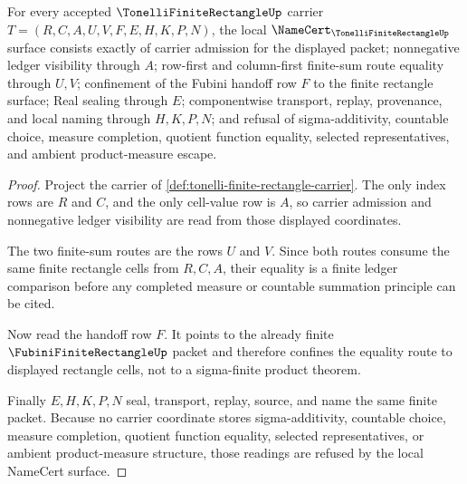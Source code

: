 \begin{theorem}
\label{thm:tonelli-finite-rectangle-namecert-obligations}
For every accepted $\TonelliFiniteRectangleUp$ carrier $T=(R,C,A,U,V,F,E,H,K,P,N)$, the local $\NameCert_{\TonelliFiniteRectangleUp}$ surface consists exactly of carrier admission for the displayed packet; nonnegative ledger visibility through $A$; row-first and column-first finite-sum route equality through $U,V$; confinement of the Fubini handoff row $F$ to the finite rectangle surface; Real sealing through $E$; componentwise transport, replay, provenance, and local naming through $H,K,P,N$; and refusal of sigma-additivity, countable choice, measure completion, quotient function equality, selected representatives, and ambient product-measure escape.
\end{theorem}
\begin{proof}
Project the carrier of \autoref{def:tonelli-finite-rectangle-carrier}. The only index rows are $R$ and $C$, and the only cell-value row is $A$, so carrier admission and nonnegative ledger visibility are read from those displayed coordinates.

The two finite-sum routes are the rows $U$ and $V$. Since both routes consume the same finite rectangle cells from $R,C,A$, their equality is a finite ledger comparison before any completed measure or countable summation principle can be cited.

Now read the handoff row $F$. It points to the already finite $\FubiniFiniteRectangleUp$ packet and therefore confines the equality route to displayed rectangle cells, not to a sigma-finite product theorem.

Finally $E,H,K,P,N$ seal, transport, replay, source, and name the same finite packet. Because no carrier coordinate stores sigma-additivity, countable choice, measure completion, quotient function equality, selected representatives, or ambient product-measure structure, those readings are refused by the local NameCert surface.
\end{proof}


